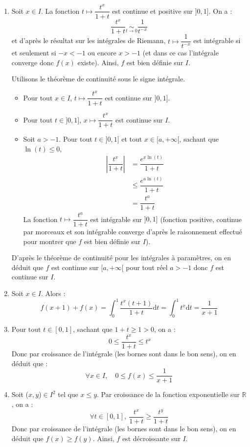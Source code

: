 \documentclass[a4paper,twoside,french,11pt]{VcCours}
\newcommand{\dt}{\text{d}t}
\begin{document}
	\begin{enumerate}
	\item Soit $x \in I$. La fonction $t\mapsto\dfrac{t^x}{1+t}$ est continue et positive sur $]0,1]$. On a :
	$$ \frac{t^{x}}{1+t} \underset{t \rightarrow 0}{\sim} \frac1{t^{-x}}$$
	et d'après le résultat sur les intégrales de Riemann, $t \mapsto \dfrac{1}{t^{-x}}$ est intégrable si et seulement si $-x<-1$ ou encore $x>-1$ (et dans ce cas l'intégrale converge donc $f(x)$ existe). Ainsi, $f$ est bien définie sur $I$.
	
	
\noindent Utilisons le théorème de continuité sous le signe intégrale.

\begin{itemize}
\item Pour tout $x \in I$, $t \mapsto \dfrac{t^x}{1+t}$ est continue sur $]0,1]$.
\item Pour tout $t \in ]0,1]$, $x \mapsto  \dfrac{t^x}{1+t}$ est continue sur $I$.
\item Soit $a>-1$. Pour tout $t \in ]0,1]$ et tout $x \in [a, + \infty[$, sachant que $\ln(t) \leq 0$,
\begin{align*}
 \left\vert \dfrac{t^x}{1+t} \right\vert & = \dfrac{e^{x \ln(t)}}{1+t} \\
 & \leq \dfrac{e^{a \ln(t)}}{1+t} \\
 & = \dfrac{t^a}{1+t}
 \end{align*}
La fonction $t \mapsto \dfrac{t^a}{1+t}$ est intégrable sur $]0,1]$ (fonction positive, continue par morceaux et son intégrable converge d'après le raisonnement effectué pour montrer que $f$ est bien définie sur $I$).
\end{itemize}
D'après le théorème de continuité pour les intégrales à paramètres, on en déduit que $f$ est continue sur $[a, + \infty[$ pour tout réel $a>-1$ donc $f$ est continue sur $I$.


	\item Soit $x \in I$.  Alors :
$$f(x+1)+f(x)=\int_0^1 \frac{t^x(t+1)}{1+t} \dt =\int_0^1t^x \dt=\frac1{x+1}$$

	\item Pour tout $t\in[0,1]$, sachant que $1+t \geq 1>0$, on a :
	$$ \ 0\le \frac{t^x}{1+t} \le t^x$$
Donc par croissance de l'intégrale (les bornes sont dans le bon sens), on en déduit que : 
$$ \forall x\in I,\quad 0\le f(x) \le \frac1{x+1}$$

	\item Soit ($x,y$)$\in I^2$ tel que $x\le y$. Par croissance de la fonction exponentielle sur $\mathbb{R}$, on a :
$$\forall t\in[0,1], \ \frac{t^x}{1+t} \ge \frac{t^y}{1+t}$$
Donc par croissance de l'intégrale (les bornes sont dans le bon sens), on en déduit que $f(x)\ge f(y)$. Ainsi, $f$ est décroissante sur $I$.


\end{enumerate}
\end{document}
